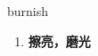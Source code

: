 
\begin{frame}
{\huge burnish}
\begin{center}
\begin{enumerate}\Large
  \item \textbf{擦亮，磨光}
\end{enumerate}
\end{center}
\end{frame}
